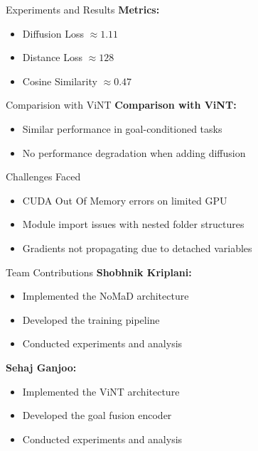 \documentclass{beamer}
\begin{document}
\begin{frame}{Experiments and Results}
\textbf{Metrics:}
\begin{itemize}
    \item Diffusion Loss $\approx 1.11$
    \item Distance Loss $\approx 128$
    \item Cosine Similarity $\approx 0.47$
\end{itemize}
\end{frame}


\begin{frame}{Comparision with ViNT}
    \textbf{Comparison with ViNT:}
\begin{itemize}
    \item Similar performance in goal-conditioned tasks
    \item No performance degradation when adding diffusion
\end{itemize}
\end{frame}
\begin{frame}{Challenges Faced}
\begin{itemize}
    \item CUDA Out Of Memory errors on limited GPU
    \item Module import issues with nested folder structures
    \item Gradients not propagating due to detached variables
\end{itemize}
\end{frame}

\begin{frame}{Team Contributions}
    \textbf{Shobhnik Kriplani:} \\
    \begin{itemize}
        \item Implemented the NoMaD architecture
        \item Developed the training pipeline
        \item Conducted experiments and analysis
    \end{itemize}
    
    \textbf{Sehaj Ganjoo:} \\
    \begin{itemize}
        \item Implemented the ViNT architecture
        \item Developed the goal fusion encoder
        \item Conducted experiments and analysis
    \end{itemize}
    
\end{frame}
\end{document}
